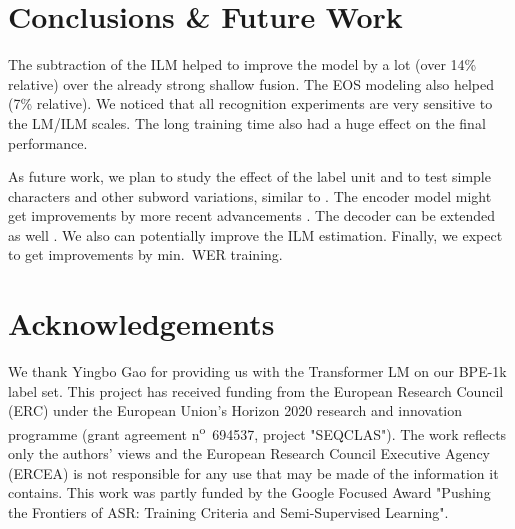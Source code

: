 \documentclass[a4paper]{article}
\begin{document}
\section{Conclusions \& Future Work}

The subtraction of the ILM helped to improve the model by a lot (over 14\% relative)
over the already strong shallow fusion.
The EOS modeling also helped (7\% relative).
We noticed that all recognition experiments are very sensitive to the LM/ILM scales.
The long training time also had a huge effect on the final performance.

As future work,
we plan to study the effect of the label unit and to test simple characters and other subword variations,
similar to \cite{zeineldeen20:phon-att}.
The encoder model might get improvements by more recent advancements \cite{gulati2020conformer}.
The decoder can be extended as well \cite{zeyer2020:transducer}.
We also can potentially improve the ILM estimation.
Finally, we expect to get improvements by min.~WER training.


\section{Acknowledgements}



We thank Yingbo Gao for providing us with the Transformer LM
on our BPE-1k label set.
This project has received funding from the European Research Council (ERC)
under the European Union’s Horizon 2020 research and innovation programme
(grant agreement n\textsuperscript{o}~694537, project "SEQCLAS"). The work
reflects only the authors' views and the European Research Council
Executive Agency (ERCEA) is not responsible for any use that may be made
of the information it contains.
This work was partly funded by the Google Focused Award "Pushing the
Frontiers of ASR: Training Criteria and Semi-Supervised Learning".





\end{document}
